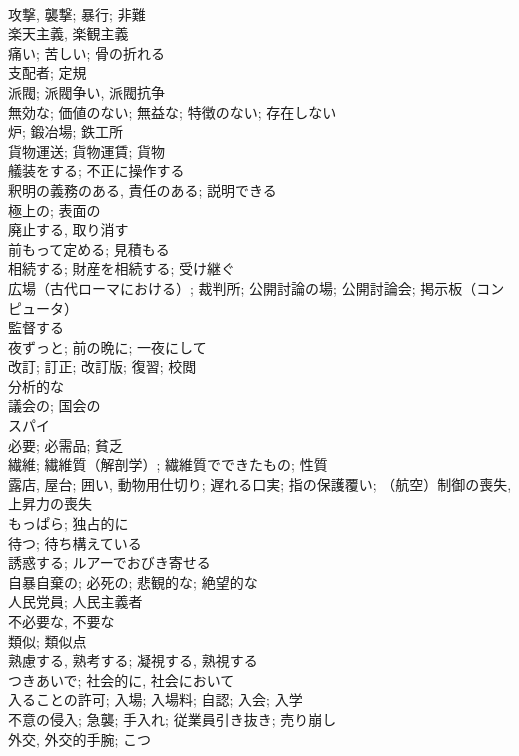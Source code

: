 \documentclass[8pt]{extreport}
\begin{document}
\begin{CJK}{UTF8}{min}
\\	攻撃, 襲撃; 暴行; 非難	
\\	楽天主義, 楽観主義	
\\	痛い; 苦しい; 骨の折れる	
\\	支配者; 定規	
\\	派閥; 派閥争い, 派閥抗争	
\\	無効な; 価値のない; 無益な; 特徴のない; 存在しない	
\\	炉; 鍛冶場; 鉄工所	
\\	貨物運送; 貨物運賃; 貨物	
\\	艤装をする; 不正に操作する	
\\	釈明の義務のある, 責任のある; 説明できる	
\\	極上の; 表面の	
\\	廃止する, 取り消す	
\\	前もって定める; 見積もる	
\\	相続する; 財産を相続する; 受け継ぐ	
\\	広場（古代ローマにおける）; 裁判所; 公開討論の場; 公開討論会; 掲示板（コンピュータ）	
\\	監督する	
\\	夜ずっと; 前の晩に; 一夜にして	
\\	改訂; 訂正; 改訂版; 復習; 校閲	
\\	分析的な	
\\	議会の; 国会の	
\\	スパイ	
\\	必要; 必需品; 貧乏	
\\	繊維; 繊維質（解剖学）; 繊維質でできたもの; 性質	
\\	露店, 屋台; 囲い, 動物用仕切り; 遅れる口実; 指の保護覆い; （航空）制御の喪失, 上昇力の喪失	
\\	もっぱら; 独占的に	
\\	待つ; 待ち構えている	
\\	誘惑する; ルアーでおびき寄せる	
\\	自暴自棄の; 必死の; 悲観的な; 絶望的な	
\\	人民党員; 人民主義者	
\\	不必要な, 不要な	
\\	類似; 類似点	
\\	熟慮する, 熟考する; 凝視する, 熟視する	
\\	つきあいで; 社会的に, 社会において	
\\	入ることの許可; 入場; 入場料; 自認; 入会; 入学	
\\	不意の侵入; 急襲; 手入れ; 従業員引き抜き; 売り崩し	
\\	外交, 外交的手腕; こつ	

\end{CJK}
\end{document}
